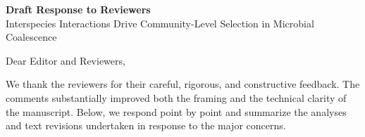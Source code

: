 \documentclass[11pt]{article}
\begin{document}
\begin{center}
{\Large \textbf{Draft Response to Reviewers}}\\[0.5em]
{\large Interspecies Interactions Drive Community-Level Selection in Microbial Coalescence}
\end{center}

Dear Editor and Reviewers,

We thank the reviewers for their careful, rigorous, and constructive feedback. The comments substantially improved both the framing and the technical clarity of the manuscript. Below, we respond point by point and summarize the analyses and text revisions undertaken in response to the major concerns.


\clearpage

\clearpage

\end{document}
